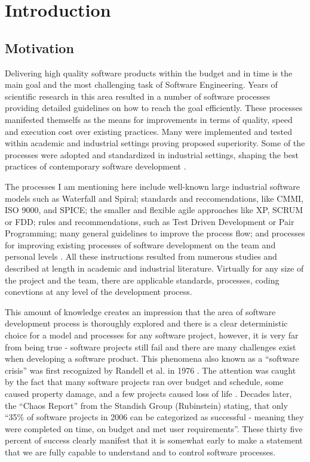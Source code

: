 \chapter{Introduction}

\section{Motivation}
Delivering high quality software products within the budget and in time is the main goal and the most 
challenging task of Software Engineering. Years of scientific research in this area resulted in a 
number of software processes providing detailed guidelines on how to reach the goal efficiently. 
These processes manifested themselfs as the means for improvements in terms of quality, 
speed and execution cost over existing practices. Many were implemented and tested within academic 
and industrial settings proving proposed superiority. Some of the processes were adopted and standardized 
in industrial settings, shaping the best practices of contemporary software development \cite{citeulike:9962021}. 

The processes I am mentioning here include well-known large industrial software models
such as Waterfall and Spiral; standards and reccomendations, like CMMI, ISO 9000, and SPICE; 
the smaller and flexible agile approaches like XP, SCRUM or FDD; 
rules and recommendations, such as Test Driven Development or Pair Programming; 
many general guidelines to improve the process flow; and processes for improving existing processes of 
software development on the team and personal levels \cite{citeulike:9962027} \cite{citeulike:9962022}.
All these instructions resulted from numerous studies and described at length in academic and 
industrial literature. Virtually for any size of the project and the team, there are applicable 
standards, processes, coding conevtions at any level of the development process.

This amount of knowledge creates an impression that the area of software development 
process is thoroughly explored and there is a clear deterministic choice for a model and processes 
for any software project, however, it is very far from being true - software projects still fail 
and there are many challenges exist when developing a software product.
This phenomena also known as a ``software crisis'' was first recognized by Randell et al. in 1976 
\cite{naur1976software}. The attention was caught by the fact that many software projects ran 
over budget and schedule, some caused property damage, and a few projects caused 
loss of life \cite{citeulike:712058}. Decades later, the ``Chaos Report'' from the Standish 
Group (Rubinstein) \cite{SDTimes} stating, that only ``35\% of software projects in 2006 can 
be categorized as successful - meaning they were completed on time, on budget and met 
user requirements''. These thirty five percent of success clearly manifest that it is somewhat 
early to make a statement that we are fully capable to understand and to control software processes.

